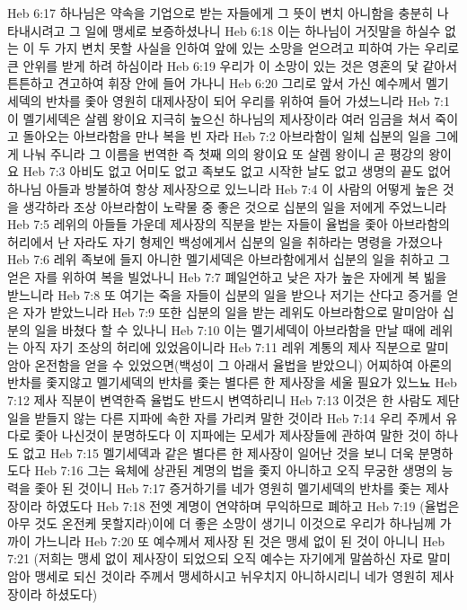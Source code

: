 Heb 6:17  하나님은 약속을 기업으로 받는 자들에게 그 뜻이 변치 아니함을 충분히 나타내시려고 그 일에 맹세로 보증하셨나니
Heb 6:18  이는 하나님이 거짓말을 하실수 없는 이 두 가지 변치 못할 사실을 인하여 앞에 있는 소망을 얻으려고 피하여 가는 우리로 큰 안위를 받게 하려 하심이라
Heb 6:19  우리가 이 소망이 있는 것은 영혼의 닻 같아서 튼튼하고 견고하여 휘장 안에 들어 가나니
Heb 6:20  그리로 앞서 가신 예수께서 멜기세덱의 반차를 좇아 영원히 대제사장이 되어 우리를 위하여 들어 가셨느니라
Heb 7:1  이 멜기세덱은 살렘 왕이요 지극히 높으신 하나님의 제사장이라 여러 임금을 쳐서 죽이고 돌아오는 아브라함을 만나 복을 빈 자라
Heb 7:2  아브라함이 일체 십분의 일을 그에게 나눠 주니라 그 이름을 번역한 즉 첫째 의의 왕이요 또 살렘 왕이니 곧 평강의 왕이요
Heb 7:3  아비도 없고 어미도 없고 족보도 없고 시작한 날도 없고 생명의 끝도 없어 하나님 아들과 방불하여 항상 제사장으로 있느니라
Heb 7:4  이 사람의 어떻게 높은 것을 생각하라 조상 아브라함이 노략물 중 좋은 것으로 십분의 일을 저에게 주었느니라
Heb 7:5  레위의 아들들 가운데 제사장의 직분을 받는 자들이 율법을 좇아 아브라함의 허리에서 난 자라도 자기 형제인 백성에게서 십분의 일을 취하라는 명령을 가졌으나
Heb 7:6  레위 족보에 들지 아니한 멜기세덱은 아브라함에게서 십분의 일을 취하고 그 얻은 자를 위하여 복을 빌었나니
Heb 7:7  폐일언하고 낮은 자가 높은 자에게 복 빎을 받느니라
Heb 7:8  또 여기는 죽을 자들이 십분의 일을 받으나 저기는 산다고 증거를 얻은 자가 받았느니라
Heb 7:9  또한 십분의 일을 받는 레위도 아브라함으로 말미암아 십분의 일을 바쳤다 할 수 있나니
Heb 7:10  이는 멜기세덱이 아브라함을 만날 때에 레위는 아직 자기 조상의 허리에 있었음이니라
Heb 7:11  레위 계통의 제사 직분으로 말미암아 온전함을 얻을 수 있었으면(백성이 그 아래서 율법을 받았으니) 어찌하여 아론의 반차를 좇지않고 멜기세덱의 반차를 좇는 별다른 한 제사장을 세울 필요가 있느뇨
Heb 7:12  제사 직분이 변역한즉 율법도 반드시 변역하리니
Heb 7:13  이것은 한 사람도 제단 일을 받들지 않는 다른 지파에 속한 자를 가리켜 말한 것이라
Heb 7:14  우리 주께서 유다로 좇아 나신것이 분명하도다 이 지파에는 모세가 제사장들에 관하여 말한 것이 하나도 없고
Heb 7:15  멜기세덱과 같은 별다른 한 제사장이 일어난 것을 보니 더욱 분명하도다
Heb 7:16  그는 육체에 상관된 계명의 법을 좇지 아니하고 오직 무궁한 생명의 능력을 좇아 된 것이니
Heb 7:17  증거하기를 네가 영원히 멜기세덱의 반차를 좇는 제사장이라 하였도다
Heb 7:18  전엣 계명이 연약하며 무익하므로 폐하고
Heb 7:19  (율법은 아무 것도 온전케 못할지라)이에 더 좋은 소망이 생기니 이것으로 우리가 하나님께 가까이 가느니라
Heb 7:20  또 예수께서 제사장 된 것은 맹세 없이 된 것이 아니니
Heb 7:21  (저희는 맹세 없이 제사장이 되었으되 오직 예수는 자기에게 말씀하신 자로 말미암아 맹세로 되신 것이라 주께서 맹세하시고 뉘우치지 아니하시리니 네가 영원히 제사장이라 하셨도다)
